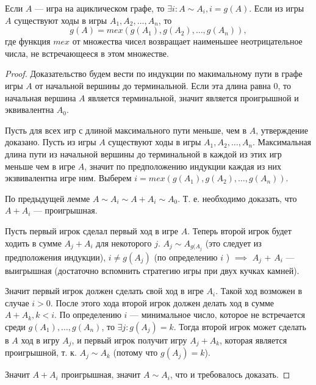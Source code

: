 \begin{theorem}
  Если $A$ --- игра на ациклическом графе, то $\exists i \colon A \sim A_{i}, i = g(A)$. Если из игры
  $A$ существуют ходы в игры $A_1, A_2, \ldots, A_{n}$, то
  \[
    g(A) = mex(g(A_1), g(A_2), \ldots, g(A_{n}))
  ,\] где функция $mex$ от множества чисел возвращает наименьшее неотрицательное числа, не
  встречающееся в этом множестве.
\end{theorem}
\begin{proof}
  Доказательство будем вести по индукции по макимальному пути в графе игры $A$ от начальной вершины
  до терминальной. Если эта длина равна $0$, то начальная вершина $A$ является терминальной, значит
  является проигрышной и эквивалентна $A_0$.

  Пусть для всех игр с длиной максимального пути меньше, чем в $A$, утверждение доказано. Пусть из игры
  $A$ существуют ходы в игры $A_1, A_2, \ldots, A_{n}$. Максимальная длина пути из начальной вершины 
  до терминальной в каждой из этих игр меньше чем в игре $A$, значит по предположению индукции каждая из
  них экзвивалентна игре ним. Выберем $i = mex(g(A_1), g(A_2), \ldots, g(A_{n}))$.

  По предыдущей лемме $A \sim A_{i} \sim A + A_{i} \sim A_0$. Т. е. необходимо доказать, что $A + A_{i}$ 
  --- проигрышная.

  Пусть первый игрок сделал первый ход в игре $A$. Теперь второй игрок будет ходить в сумме 
  $A_{j} + A_{i}$ для некоторого $j$. $A_{j} \sim A_{g(A_{j}}$ (это следует из предположения индукции), 
  $i \neq g(A_{j})$ (по определению $i$ ) $\implies$ $A_{j}$ + $A_{i}$ --- выигрышная (достаточно вспомнить
  стратегию игры при двух кучках камней). 

  Значит первый игрок должен сделать свой ход в игре $A_{i}$. Такой ход возможен в случае $i > 0$.
  После этого хода второй игрок должен делать ход в сумме  $A + A_{k}, k < i$. По определению $i$ --- 
  минимальное число, которое не встречается среди $g(A_1), \ldots, g(A_{n})$, то 
  $\exists j \colon g(A_{j}) = k$. Тогда второй игрок может сделать в $A$ ход в игру $A_{j}$, и 
  первый игрок получит игру $A_{j} + A_{k}$, которая является проигрышной, т. к. $A_{j} \sim A_{k}$ (потому 
  что $g(A_{j}) = k$).

  Значит $A + A_{i}$ проигрышная, значит $A \sim A_{i}$, что и требовалось доказать.
\end{proof} 


